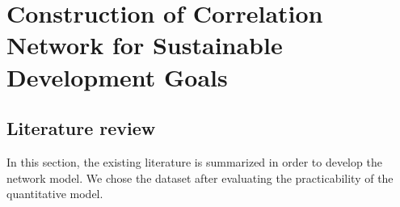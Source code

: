 \documentclass[10pt]{mcmthesis}
\begin{document}

















\section{Construction of Correlation Network for Sustainable Development Goals}

\subsection{ Literature review }
In this section, the existing literature is summarized in order to develop the network model. We chose the dataset after evaluating the practicability of the quantitative model.
\end{document}
